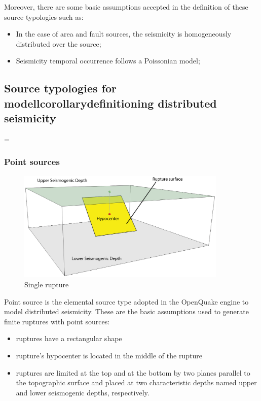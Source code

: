 Moreover, there are some basic assumptions accepted in the definition of these 
source typologies such as:
\begin{itemize}
	\item In the case of area and fault sources, the seismicity is homogeneously 
		distributed over the source; 	
	\item Seismicity temporal occurrence follows a Poissonian model; 
\end{itemize}
\subsection{Source typologies for modellcorollarydefinitioning distributed seismicity}
=\subsubsection{Point sources}
\label{hazard:seismic_source_types:pointSources}
\begin{figure}[!ht]
\centering
\includegraphics[width=10cm]{./figures/hazard/single_rupture.eps}
\caption{Single rupture}
\label{fig:single_rupture}
\end{figure}
Point source is the elemental source type adopted in the OpenQuake engine 
to model distributed seismicity. These are the basic assumptions used to 
generate finite ruptures with point sources:
\begin{itemize}
	\item ruptures have a rectangular shape
	\item rupture's hypocenter is located in the middle of the rupture
	\item ruptures are limited at the top and at the bottom by two planes 
	parallel to the topographic surface and placed at two characteristic 
	depths named upper and lower seismogenic depths, respectively.
\end{itemize} 
%
